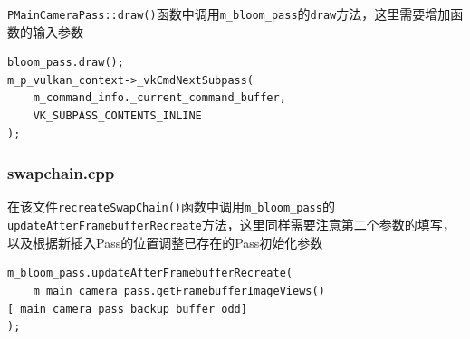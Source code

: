 \documentclass{ctexart}
\begin{document}
    \verb|PMainCameraPass::draw()|函数中调用\verb|m_bloom_pass|的\verb|draw|方法，这里需要增加函数的输入参数
    \begin{verbatim}
bloom_pass.draw();
m_p_vulkan_context->_vkCmdNextSubpass(
    m_command_info._current_command_buffer, 
    VK_SUBPASS_CONTENTS_INLINE
);
    \end{verbatim}
    \subsubsection{swapchain.cpp}
    在该文件\verb|recreateSwapChain()|函数中调用\verb|m_bloom_pass|的\verb|updateAfterFramebufferRecreate|方法，这里同样需要注意第二个参数的填写，以及根据新插入Pass的位置调整已存在的Pass初始化参数
    \begin{verbatim}
m_bloom_pass.updateAfterFramebufferRecreate(
    m_main_camera_pass.getFramebufferImageViews()[_main_camera_pass_backup_buffer_odd]
);
    \end{verbatim}
    
\end{document}
